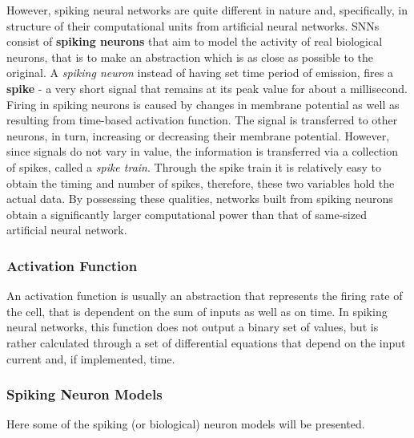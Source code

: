 \documentclass[12pt]{report}
\begin{document}
However, spiking neural networks are quite different in nature and, specifically, in structure of their computational units from artificial neural networks. SNNs consist of \textbf{spiking neurons} 
that aim to model the activity of real biological neurons, that is to make an abstraction which is as close as possible to the original. A \emph{spiking neuron} instead of
having set time period of emission, fires a \textbf{spike} - a very short signal that remains at its peak value for about a millisecond. Firing in spiking neurons is caused
by changes in membrane potential as well as resulting from time-based activation function. The signal is transferred to other neurons, in turn, increasing or decreasing their
membrane potential. However, since signals do not vary in value, the information is transferred via a collection of spikes, called a \emph{spike train}. Through the spike train
it is relatively easy to obtain the timing and number of spikes, therefore, these two variables hold the actual data.\cite{WulframGerstner2002} By possessing these qualities, networks 
built from spiking neurons obtain a significantly larger computational power than that of same-sized artificial neural network.\cite{Maass2003}

\subsubsection{Activation Function}

An activation function is usually an abstraction that represents the firing rate of the cell, that is dependent on the sum of inputs as well as on time.\cite{ActFunc} In spiking neural networks,
this function does not output a binary set of values, but is rather calculated through a set of differential equations that depend on the input current and, if implemented, time.

\subsubsection{Spiking Neuron Models}

Here some of the spiking (or biological) neuron models will be presented.
\end{document}
